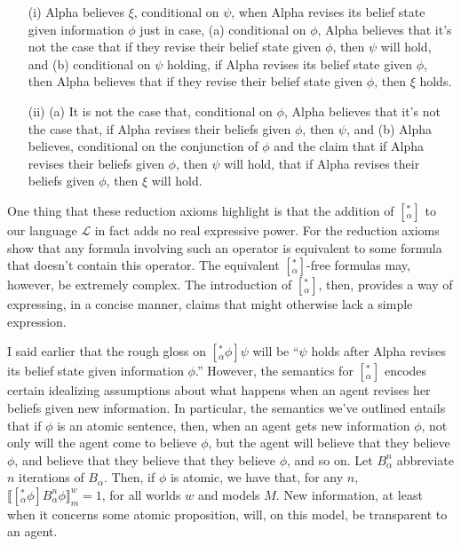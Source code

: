 \begin{itemize}
\item[(i)] Alpha believes $\xi$, conditional on $\psi$, when Alpha revises its belief state given information $\phi$ just in case, (a) conditional on $\phi$, Alpha believes that it's not the case that if they revise their belief state given $\phi$, then $\psi$ will hold, and (b) conditional on $\psi$ holding, if Alpha revises its belief state given $\phi$, then Alpha believes that if they revise their belief state given $\phi$, then $\xi$ holds.
\item[(ii)] (a) It is not the case that, conditional on $\phi$, Alpha believes that it's not the case that, if Alpha revises their beliefs given $\phi$, then $\psi$, and (b) Alpha believes, conditional on the conjunction of $\phi$ and the claim that if Alpha revises their beliefs given $\phi$, then $\psi$ will hold, that if Alpha revises their beliefs given $\phi$, then $\xi$ will hold.
\end{itemize}


One thing that these reduction axioms highlight is that the addition of  $[^*_\alpha]$ to our language $\mathcal{L}$ in fact adds no real expressive power.
For the reduction axioms show that any formula involving such an operator is equivalent to some formula that doesn't contain this operator.
The equivalent $[^*_\alpha]$-free formulas may, however, be extremely complex.
The introduction of $[^*_\alpha]$, then, provides a way of expressing, in a concise manner, claims that might otherwise lack a simple expression.

I said earlier that the rough gloss on $[^*_\alpha \phi] \psi$ will be ``$\psi$ holds after Alpha revises its belief state given information $\phi$.''
However, the semantics for $[^*_\alpha]$ encodes certain idealizing assumptions about what happens when an agent revises her beliefs given new information.
In particular, the semantics we've outlined entails that if  $\phi$ is an atomic sentence, then, when an agent gets new information $\phi$, not only will the agent come to believe $\phi$, but the agent will believe that they believe $\phi$, and believe that they believe that they believe $\phi$, and so on.
Let $B_\alpha^n$ abbreviate $n$ iterations of $B_\alpha$.
Then, if $\phi$ is atomic, we have that, for any $n$, $\llbracket [^*_\alpha \phi] B_\alpha^n \phi \rrbracket_m^w = 1$, for all worlds $w$ and models $M$. 
New information, at least when it concerns some atomic proposition, will, on this model, be transparent to an agent.

